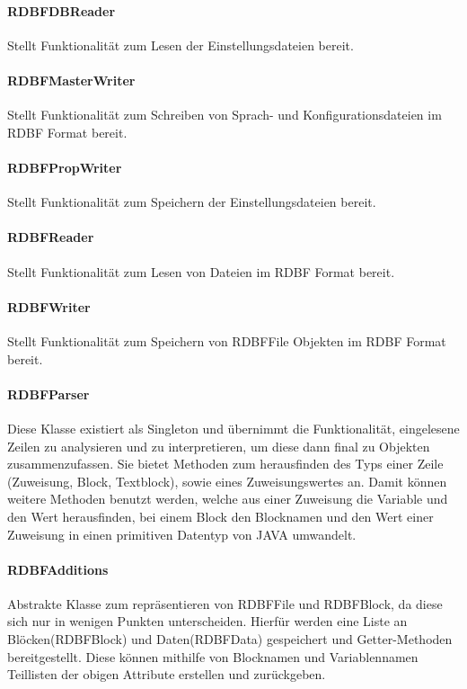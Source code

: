 \documentclass[parskip=full]{scrartcl}
\begin{document}
\paragraph{RDBFDBReader}
Stellt Funktionalität zum Lesen der Einstellungsdateien bereit.
\paragraph{RDBFMasterWriter}
Stellt Funktionalität zum Schreiben von Sprach- und Konfigurationsdateien im RDBF Format bereit.
\paragraph{RDBFPropWriter}
Stellt Funktionalität zum Speichern der Einstellungsdateien bereit.
\paragraph{RDBFReader}
Stellt Funktionalität zum Lesen von Dateien im RDBF Format bereit.
\paragraph{RDBFWriter}
Stellt Funktionalität zum Speichern von RDBFFile Objekten im RDBF Format bereit.
\paragraph{RDBFParser}
Diese Klasse existiert als Singleton und übernimmt die Funktionalität, eingelesene Zeilen zu analysieren und zu interpretieren, um diese dann final zu Objekten zusammenzufassen.
Sie bietet Methoden zum herausfinden des Typs einer Zeile (Zuweisung, Block, Textblock), sowie eines Zuweisungswertes an.
Damit können weitere Methoden benutzt werden, welche aus einer Zuweisung die Variable und den Wert herausfinden, bei einem Block den Blocknamen und den Wert einer Zuweisung in einen primitiven Datentyp von JAVA umwandelt.
\paragraph{RDBFAdditions}
Abstrakte Klasse zum repräsentieren von RDBFFile und RDBFBlock, da diese sich nur in wenigen Punkten unterscheiden.
Hierfür werden eine Liste an Blöcken(RDBFBlock) und Daten(RDBFData) gespeichert und Getter-Methoden bereitgestellt.
Diese können mithilfe von Blocknamen und Variablennamen Teillisten der obigen Attribute erstellen und zurückgeben.
\end{document}
